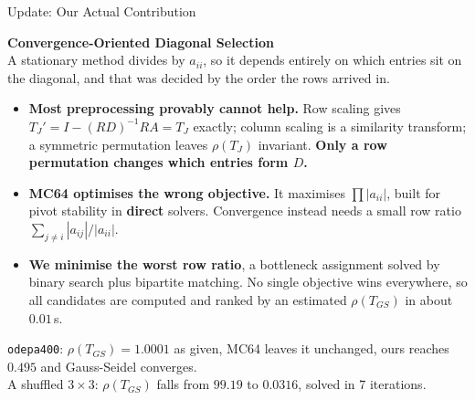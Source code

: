 \documentclass[aspectratio=169,10pt]{beamer}
\renewcommand{\emph}[1]{{\color{LSteal}\bfseries #1}}
\newcommand{\gd}[1]{{\color{LSgreen}\bfseries #1}}
\begin{document}
\begin{frame}{Update: Our Actual Contribution}
  \vspace{-0.15em}
  \colorbox{LSlightgold}{\parbox{0.98\linewidth}{\vspace{0.25em}
    {\bfseries\normalsize\color{LSnavy} Convergence-Oriented Diagonal Selection}\\[0.15em]
    {\footnotesize\color{LSgray} A stationary method divides by $a_{ii}$, so it depends entirely on
    which entries sit on the diagonal, and that was decided by the order the rows arrived in.}
    \vspace{0.25em}}}
  \vspace{0.5em}
  \small
  \begin{itemize}\setlength\itemsep{0.42em}
    \item \textbf{\color{LSteal}Most preprocessing provably cannot help.}
      Row scaling gives $T_J' = I - (RD)^{-1}RA = T_J$ exactly; column scaling is a similarity
      transform; a symmetric permutation leaves $\rho(T_J)$ invariant. \textbf{Only a row
      permutation changes which entries form $D$.}
    \item \textbf{\color{LSteal}MC64 optimises the wrong objective.}
      It maximises $\prod |a_{ii}|$, built for pivot stability in \emph{direct} solvers.
      Convergence instead needs a small row ratio $\sum_{j \ne i} |a_{ij}| / |a_{ii}|$.
    \item \textbf{\color{LSteal}We minimise the worst row ratio}, a bottleneck assignment solved
      by binary search plus bipartite matching. No single objective wins everywhere, so all
      candidates are computed and ranked by an estimated $\rho(T_{GS})$ in about $0.01$\,s.
  \end{itemize}
  \vspace{0.4em}
  \begin{center}
  \colorbox{LSlight}{\parbox{0.94\linewidth}{\centering\footnotesize
  \texttt{odepa400}: $\rho(T_{GS}) = 1.0001$ as given, MC64 leaves it unchanged,
  ours reaches \gd{$0.495$} and Gauss-Seidel converges.\\
  A shuffled $3\times3$: $\rho(T_{GS})$ falls from $99.19$ to $0.0316$, solved in 7 iterations.}}
  \end{center}
\end{frame}
\end{document}

